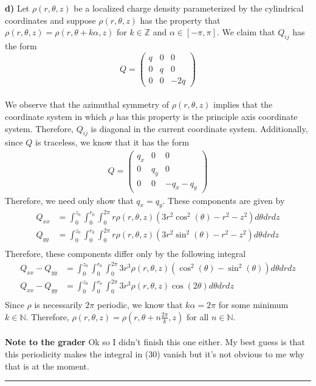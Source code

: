 \documentclass[]{book}
\begin{document}
\textbf{d)} Let $\rho(r,\theta, z)$ be a localized charge density parameterized by the cylindrical coordinates and suppose $\rho(r,\theta, z)$ has the property that $\rho(r,\theta, z) = \rho(r,\theta + k\alpha,z)$ for $k\in\mathbb{Z}$ and $\alpha\in[-\pi,\pi]$. We claim that $Q_{ij}$ has the form
\begin{equation}
Q = 
\left( \begin{array}{ccc}
q & 0 & 0 \\
0 & q & 0 \\
0 & 0 & -2q 
\end{array} \right)
\end{equation} \\
We observe that the azimuthal symmetry of $\rho(r,\theta, z)$ implies that the coordinate system in which $\rho$ has this property is the principle axis coordinate system. Therefore, $Q_{ij}$ is diagonal in the current coordinate system. Additionally, since $Q$ is traceless, we know that it has the form
\begin{equation}
\begin{split}
Q  = \left( \begin{array}{ccc}
q_x & 0 & 0 \\
0 & q_y & 0 \\
0 & 0 & -q_x-q_y
\end{array} \right)
\end{split}
\end{equation}
Therefore, we need only show that $q_x = q_y$. These components are given by
\begin{equation}
\begin{split}
Q_{xx} & = \int_{0}^{z_0}\int_{0}^{r_0}\int_{0}^{2\pi}r\rho(r,\theta,z)(3 r^2 \cos ^2(\theta )-r^2-z^2 )d\theta dr dz \\
Q_{yy} & = \int_{0}^{z_0}\int_{0}^{r_0}\int_{0}^{2\pi}r\rho(r,\theta,z)(3 r^2 \sin ^2(\theta )-r^2-z^2)d\theta dr dz \\
\end{split}
\end{equation}
Therefore, these components differ only by the following integral
\begin{equation}
\begin{split}
Q_{xx} - Q_{yy} & = \int_{0}^{z_0}\int_{0}^{r_0}\int_{0}^{2\pi}3r^3\rho(r,\theta,z)( \cos ^2(\theta ) - \sin ^2(\theta ) )d\theta dr dz \\
Q_{xx} - Q_{yy} & = \int_{0}^{z_0}\int_{0}^{r_0}\int_{0}^{2\pi}3r^3\rho(r,\theta,z)\cos (2\theta )d\theta dr dz \\
\end{split}
\end{equation}
Since $\rho$ is necessarily $2\pi$ periodic, we know that $k\alpha = 2\pi$ for some minimum $k\in\mathbb{N}$. Therefore, $\rho(r,\theta, z) = \rho(r,\theta + n\frac{2\pi}{k},z)$ for all $n\in\mathbb{N}$.\\
\\
{\bf Note to the grader} Ok so I didn't finish this one either. My best guess is that this periodicity makes the integral in (30) vanish but it's not obvious to me why that is at the moment. 
\\
\noindent\rule{15cm}{0.4pt} \\
\end{document}
